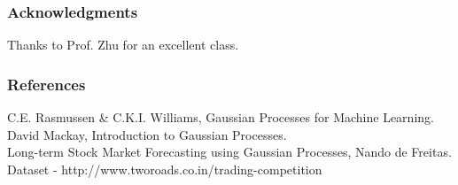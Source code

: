 \documentclass{article} %
\begin{document}
\subsubsection*{Acknowledgments}
Thanks to Prof. Zhu for an excellent class.

\subsubsection*{References}
\small{
C.E. Rasmussen \& C.K.I. Williams, Gaussian Processes for Machine Learning. \\
David Mackay, Introduction to Gaussian Processes.\\
Long-term Stock Market Forecasting using Gaussian Processes, Nando de Freitas.
Dataset - http://www.tworoads.co.in/trading-competition}
\end{document}
